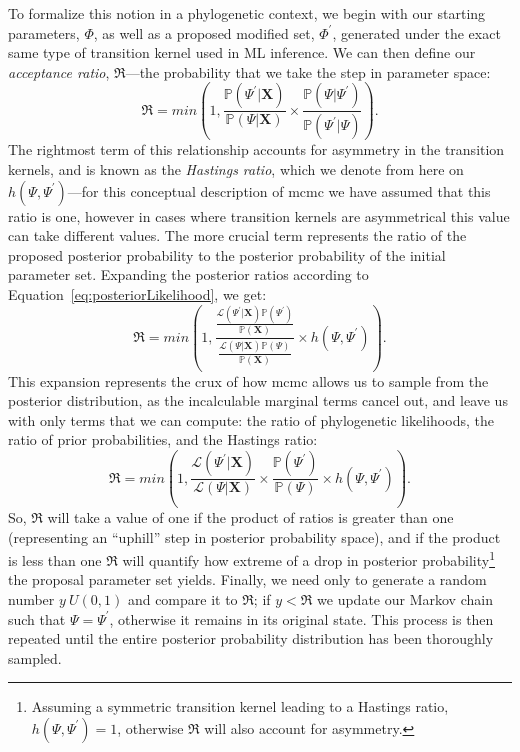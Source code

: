 To formalize this notion in a phylogenetic context, we begin with our starting parameters, $\Phi$, as well as a proposed modified set, $\Phi^{\prime}$, generated under the exact same type of transition kernel used in ML inference.
We can then define our \textit{acceptance ratio}, $\mathfrak{R}$---the probability that we take the step in parameter space:
\begin{equation}
  \mathfrak{R} = 
    min \left( 1, \frac{\mathbb{P}(\Psi^{\prime}|\mathbf{X})}
                       {\mathbb{P}(\Psi|\mathbf{X})} \times 
                         \frac{\mathbb{P}(\Psi|\Psi^{\prime})}
                              {\mathbb{P}(\Psi^{\prime}|\Psi)} \right).
\end{equation}
The rightmost term of this relationship accounts for asymmetry in the transition kernels, and is known as the \textit{Hastings ratio}, which we denote from here on $h(\Psi,\Psi^{\prime})$---for this conceptual description of \gls{mcmc} we have assumed that this ratio is one, however in cases where transition kernels are asymmetrical this value can take different values.
The more crucial term represents the ratio of the proposed posterior probability to the posterior probability of the initial parameter set.
Expanding the posterior ratios according to Equation~\ref{eq:posteriorLikelihood}, we get:
\begin{equation}
  \mathfrak{R} =
    min \left( 1, \frac{\frac{\mathcal{L}(\Psi^{\prime}|\mathbf{X}) \mathbb{P}(\Psi^{\prime})}
                             {\mathbb{P}(\mathbf{X})}}
                       {\frac{\mathcal{L}(\Psi|\mathbf{X}) \mathbb{P}(\Psi)}
                             {\mathbb{P}(\mathbf{X})}}
                       \times h(\Psi,\Psi^{\prime}) \right).
\end{equation}
This expansion represents the crux of how \gls{mcmc} allows us to sample from the posterior distribution, as the incalculable marginal terms cancel out, and leave us with only terms that we can compute: the ratio of phylogenetic likelihoods, the ratio of prior probabilities, and the Hastings ratio:
\begin{equation}
  \mathfrak{R} =
    min \left( 1, \frac{\mathcal{L}(\Psi^{\prime}|\mathbf{X})}
                       {\mathcal{L}(\Psi|\mathbf{X})}
                  \times
                  \frac{\mathbb{P}(\Psi^{\prime})}
                       {\mathbb{P}(\Psi)}
                  \times
                  h(\Psi,\Psi^{\prime}) \right).
\end{equation}
So, $\mathfrak{R}$ will take a value of one if the product of ratios is greater than one (representing an ``uphill'' step in posterior probability space), and if the product is less than one $\mathfrak{R}$ will quantify how extreme of a drop in posterior probability\footnote{Assuming a symmetric transition kernel leading to a Hastings ratio, $h(\Psi,\Psi^{\prime}) = 1$, otherwise $\mathfrak{R}$ will also account for asymmetry.} the proposal parameter set yields.
Finally, we need only to generate a random number $y~U(0,1)$ and compare it to $\mathfrak{R}$; if $y < \mathfrak{R}$ we update our Markov chain such that $\Psi = \Psi^{\prime}$, otherwise it remains in its original state.
This process is then repeated until the entire posterior probability distribution has been thoroughly sampled.

